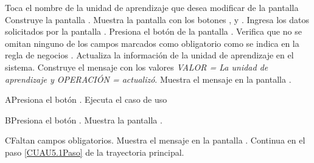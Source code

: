 	\begin{UCtrayectoria}
		\UCpaso[\UCactor] Toca el nombre de la unidad de aprendizaje que desea modificar de la pantalla 
		\UCpaso[\UCsist] Construye la pantalla .
		\UCpaso[\UCsist] Muestra la pantalla  con los botones ,  y . \label{CUU5.2:uaEditar}  
		\UCpaso[\UCactor] Ingresa los datos solicitados por la pantalla .\label{CUAU5.2Paso}
		\UCpaso[\UCactor] Presiona el botón  de la pantalla .
		\UCpaso[\UCsist] Verifica que no se omitan ninguno de los campos marcados como obligatorio como se indica en la regla de negocios . 
		\UCpaso[\UCsist] Actualiza la información de  la unidad de aprendizaje en el sistema.
		\UCpaso[\UCsist] Construye el mensaje  con los valores \textit{VALOR = La unidad de aprendizaje y OPERACIÓN = actualizó}.
		\UCpaso[\UCsist] Muestra el mensaje  en la pantalla .
	 	\end{UCtrayectoria}
	
	\begin{UCtrayectoriaA}{A}{Presiona el botón .}
		\UCpaso[\UCsist] Ejecuta el caso de uso 
	\end{UCtrayectoriaA}
	
	\begin{UCtrayectoriaA}{B}{Presiona el botón .}
		\UCpaso[\UCsist] Muestra la pantalla .
	\end{UCtrayectoriaA}
	
\begin{UCtrayectoriaA}{C}{Faltan campos obligatorios.}
	\UCpaso[\UCsist] Muestra el mensaje  en la pantalla  .
	\UCpaso[] Continua en el paso \ref{CUAU5.1Paso} de la trayectoria principal.
\end{UCtrayectoriaA}

	
	
	
	
